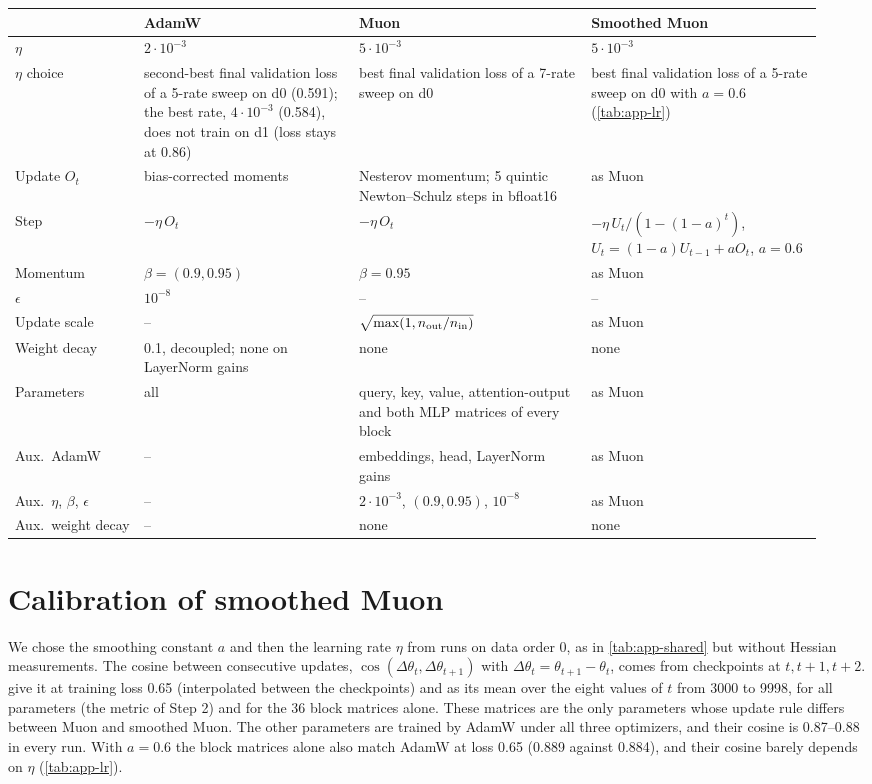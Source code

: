 \begin{center}\small
\captionsetup{type=table}
\caption{Optimizer-specific hyperparameters. $n_{\rm out}$, $n_{\rm in}$: output and input size of the matrix.
Smoothed Muon differs from Muon in the rows ``Step'' and $\eta$ only.}
\label{tab:app-optim}
\setlength{\tabcolsep}{4pt}
\begin{tabular}{@{}p{0.15\linewidth}p{0.25\linewidth}p{0.27\linewidth}p{0.27\linewidth}@{}}
\hline
 & AdamW & Muon & Smoothed Muon \tabularnewline
\hline
$\eta$ & $2\cdot10^{-3}$ & $5\cdot10^{-3}$ & $5\cdot10^{-3}$ \tabularnewline
$\eta$ choice & \raggedright second-best final validation loss of a 5-rate sweep on d0 (0.591); the best rate,
  $4\cdot10^{-3}$ (0.584), does not train on d1 (loss stays at 0.86) & \raggedright best final validation loss of a 7-rate sweep on d0 &
  \raggedright best final validation loss of a 5-rate sweep on d0 with $a=0.6$ (\cref{tab:app-lr}) \tabularnewline
Update $O_t$ & bias-corrected moments & \raggedright Nesterov momentum; 5 quintic Newton--Schulz steps in bfloat16 &
  as Muon \tabularnewline
Step & $-\eta\,O_t$ & $-\eta\,O_t$ & \raggedright $-\eta\,U_t/(1-(1-a)^t)$, $U_t=(1-a)U_{t-1}+aO_t$, $a=0.6$
  \tabularnewline
Momentum & $\beta=(0.9,0.95)$ & $\beta=0.95$ & as Muon \tabularnewline
$\epsilon$ & $10^{-8}$ & -- & -- \tabularnewline
Update scale & -- & $\sqrt{\max(1,n_{\rm out}/n_{\rm in})}$ & as Muon \tabularnewline
Weight decay & \raggedright 0.1, decoupled; none on LayerNorm gains & none & none \tabularnewline
Parameters & all & \raggedright query, key, value, attention-output and both MLP matrices of every block & as Muon
  \tabularnewline
\hline
Aux.\ AdamW & -- & embeddings, head, LayerNorm gains & as Muon \tabularnewline
Aux.\ $\eta$, $\beta$, $\epsilon$ & -- & $2\cdot10^{-3}$, $(0.9,0.95)$, $10^{-8}$ & as Muon \tabularnewline
Aux.\ weight decay & -- & none & none \tabularnewline
\hline
\end{tabular}
\end{center}

\section{Calibration of smoothed Muon}
\label{app:calib}

We chose the smoothing constant $a$ and then the learning rate $\eta$ from runs on data order 0, as in
\cref{tab:app-shared} but without Hessian measurements. The cosine between consecutive updates,
$\cos(\Delta\theta_t,\Delta\theta_{t+1})$ with $\Delta\theta_t=\theta_{t+1}-\theta_t$, comes from checkpoints at
$t,t+1,t+2$.  give it at training loss 0.65 (interpolated between the checkpoints) and
as its mean over the eight values of $t$ from 3000 to 9998, for all parameters (the metric of Step 2) and for the 36
block matrices alone. These matrices are the only parameters whose update rule differs between Muon and smoothed Muon.
The other parameters are trained by AdamW under all three optimizers, and their cosine is 0.87--0.88 in every run.
With $a=0.6$ the block matrices alone also match AdamW at loss 0.65 (0.889 against 0.884), and their cosine barely
depends on $\eta$ (\cref{tab:app-lr}).

